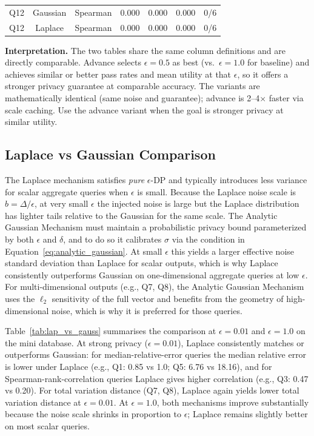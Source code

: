 \documentclass[12pt,letterpaper]{article}
\begin{document}
\begin{table}[H]
\begin{tabular}{@{}cclrrrr@{}}
Q12 & Gaussian & Spearman & 0.000 & 0.000 & 0.000 & 0/6 \\
Q12 & Laplace  & Spearman & 0.000 & 0.000 & 0.000 & 0/6 \\
\bottomrule
\end{tabular}
\par\vspace{0.4em}\footnotesize\noindent\textbf{Interpretation.} The two tables share the same column definitions and are directly comparable. Advance selects $\epsilon = 0.5$ as best (vs.\ $\epsilon = 1.0$ for baseline) and achieves similar or better pass rates and mean utility at that $\epsilon$, so it offers a stronger privacy guarantee at comparable accuracy. The variants are mathematically identical (same noise and guarantee); advance is 2--4$\times$ faster via scale caching. Use the advance variant when the goal is stronger privacy at similar utility.
\end{table}

\subsection{Laplace vs Gaussian Comparison}
\label{sec:laplace_vs_gaussian}

The Laplace mechanism satisfies \emph{pure} $\epsilon$-DP and typically introduces less variance for scalar aggregate queries when $\epsilon$ is small. Because the Laplace noise scale is $b = \Delta/\epsilon$, at very small $\epsilon$ the injected noise is large but the Laplace distribution has lighter tails relative to the Gaussian for the same scale. The Analytic Gaussian Mechanism must maintain a probabilistic privacy bound parameterized by both $\epsilon$ and $\delta$, and to do so it calibrates $\sigma$ via the condition in Equation~\eqref{eq:analytic_gaussian}. At small $\epsilon$ this yields a larger effective noise standard deviation than Laplace for scalar outputs, which is why Laplace consistently outperforms Gaussian on one-dimensional aggregate queries at low $\epsilon$. For multi-dimensional outputs (e.g., Q7, Q8), the Analytic Gaussian Mechanism uses the $\ell_2$ sensitivity of the full vector and benefits from the geometry of high-dimensional noise, which is why it is preferred for those queries.

Table~\ref{tab:lap_vs_gauss} summarises the comparison at $\epsilon = 0.01$ and $\epsilon = 1.0$ on the mini database. At strong privacy ($\epsilon = 0.01$), Laplace consistently matches or outperforms Gaussian: for median-relative-error queries the median relative error is lower under Laplace (e.g., Q1: 0.85 vs 1.0; Q5: 6.76 vs 18.16), and for Spearman-rank-correlation queries Laplace gives higher correlation (e.g., Q3: 0.47 vs 0.20). For total variation distance (Q7, Q8), Laplace again yields lower total variation distance at $\epsilon = 0.01$. At $\epsilon = 1.0$, both mechanisms improve substantially because the noise scale shrinks in proportion to $\epsilon$; Laplace remains slightly better on most scalar queries.
\end{document}
